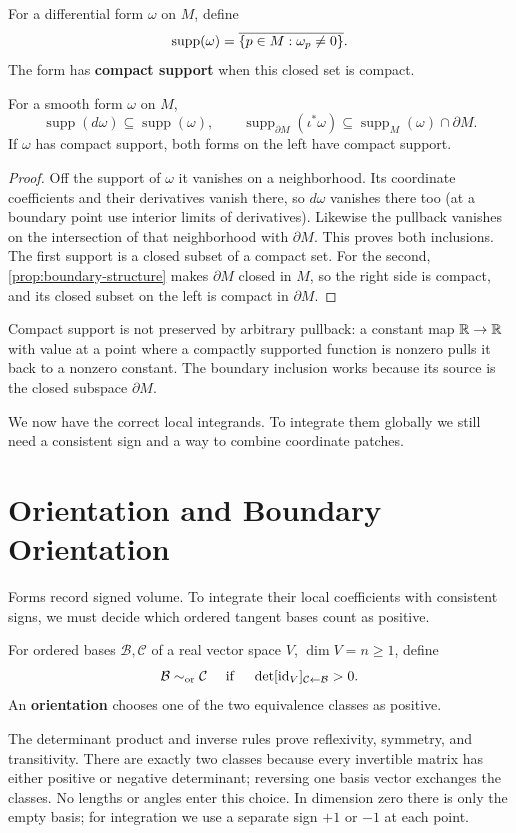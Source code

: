 \begin{definition}\label{def:form-support}
For a differential form $\omega$ on $M$, define
\[
\operatorname{supp}(\omega)
=
\overline{\left\{p\in M:\omega_p\ne0\right\}}.
\]
The form has \textbf{compact support} when this closed set is compact.
\end{definition}
\begin{lemma}\label{lem:form-support}
For a smooth form $\omega$ on $M$,
\[
\operatorname{supp}(d\omega)\subseteq\operatorname{supp}(\omega),\qquad
\operatorname{supp}_{\partial M}(\iota^*\omega)
\subseteq\operatorname{supp}_M(\omega)\cap\partial M.
\]
If $\omega$ has compact support, both forms on the left have compact support.
\end{lemma}
\begin{proof}
Off the support of $\omega$ it vanishes on a neighborhood. Its coordinate
coefficients and their derivatives vanish there, so $d\omega$ vanishes
there too (at a boundary point use interior limits of derivatives).
Likewise the pullback vanishes on the intersection of that neighborhood
with $\partial M$. This proves both inclusions. The first support is a
closed subset of a compact set. For the second, \cref{prop:boundary-structure}
makes $\partial M$ closed in $M$, so the right side is compact, and its
closed subset on the left is compact in $\partial M$.
\end{proof}
Compact support is not preserved by arbitrary pullback: a constant map
$\mathbb{R}\to\mathbb{R}$ with value at a point where a compactly supported function
is nonzero pulls it back to a nonzero constant. The boundary inclusion
works because its source is the closed subspace $\partial M$.

We now have the correct local integrands. To integrate them globally we
still need a consistent sign and a way to combine coordinate patches.

\section{Orientation and Boundary Orientation}
\label{sec:manifold-orientation}
Forms record signed volume. To integrate their local coefficients with
consistent signs, we must decide which ordered tangent bases count as positive.

\begin{definition}
For ordered bases $\mathcal B,\mathcal C$ of a real vector space $V$,
$\dim V=n\geq1$, define
\[
\mathcal B\sim_{\rm or}\mathcal C\quad\text{ if }\quad
\det[\operatorname{id}_V]_{\mathcal C\leftarrow\mathcal B}>0.
\]
An \textbf{orientation} chooses one of the two equivalence classes as positive.
\end{definition}
The determinant product and inverse rules prove reflexivity, symmetry,
and transitivity. There are exactly two classes because every invertible
matrix has either positive or negative determinant; reversing one basis
vector exchanges the classes. No lengths or angles enter this choice.
In dimension zero there is only the empty basis; for integration we use
a separate sign $+1$ or $-1$ at each point.

